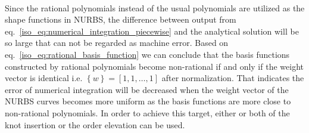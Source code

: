 \paragraph{}
Since the rational polynomials instead of the usual polynomials are utilized as the shape functions in NURBS, the difference between output from eq.~\ref{iso_eq:numerical_integration_piecewise} and the analytical solution will be so large that can not be regarded as machine error.
Based on eq.~\ref{iso_eq:rational_basis_function} we can conclude that the basis functions constructed by rational polynomials become non-rational if and only if the weight vector is identical i.e. $\left\{ w \right\} = \left[ 1,1,\dots,1 \right]$ after normalization.
That indicates the error of numerical integration will be decreased when the weight vector of the NURBS curves becomes more uniform as the basis functions are more close to non-rational polynomials.
In order to achieve this target, either or both of the knot insertion or the order elevation can be used.
\pagebreak